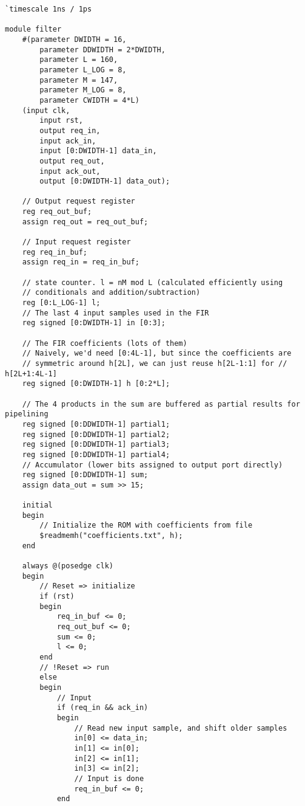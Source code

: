 \begin{verbatim}
`timescale 1ns / 1ps

module filter
    #(parameter DWIDTH = 16,
        parameter DDWIDTH = 2*DWIDTH,
        parameter L = 160,
        parameter L_LOG = 8,
        parameter M = 147,
        parameter M_LOG = 8,
        parameter CWIDTH = 4*L)
    (input clk,
        input rst,
        output req_in,
        input ack_in,
        input [0:DWIDTH-1] data_in,
        output req_out,
        input ack_out,
        output [0:DWIDTH-1] data_out);

    // Output request register
    reg req_out_buf;
    assign req_out = req_out_buf;

    // Input request register
    reg req_in_buf;
    assign req_in = req_in_buf;

    // state counter. l = nM mod L (calculated efficiently using 
    // conditionals and addition/subtraction)
    reg [0:L_LOG-1] l;
    // The last 4 input samples used in the FIR
    reg signed [0:DWIDTH-1] in [0:3];

    // The FIR coefficients (lots of them)
    // Naively, we'd need [0:4L-1], but since the coefficients are
    // symmetric around h[2L], we can just reuse h[2L-1:1] for // h[2L+1:4L-1]
    reg signed [0:DWIDTH-1] h [0:2*L];
    
    // The 4 products in the sum are buffered as partial results for pipelining
    reg signed [0:DDWIDTH-1] partial1;
    reg signed [0:DDWIDTH-1] partial2;
    reg signed [0:DDWIDTH-1] partial3;
    reg signed [0:DDWIDTH-1] partial4;
    // Accumulator (lower bits assigned to output port directly)
    reg signed [0:DDWIDTH-1] sum;
    assign data_out = sum >> 15;

    initial
    begin
        // Initialize the ROM with coefficients from file
        $readmemh("coefficients.txt", h);
    end

    always @(posedge clk)
    begin
        // Reset => initialize
        if (rst)
        begin
            req_in_buf <= 0;
            req_out_buf <= 0;
            sum <= 0;
            l <= 0;
        end
        // !Reset => run
        else
        begin
            // Input
            if (req_in && ack_in)
            begin
                // Read new input sample, and shift older samples
                in[0] <= data_in;
                in[1] <= in[0];
                in[2] <= in[1];
                in[3] <= in[2];
                // Input is done
                req_in_buf <= 0;
            end


\end{verbatim}

